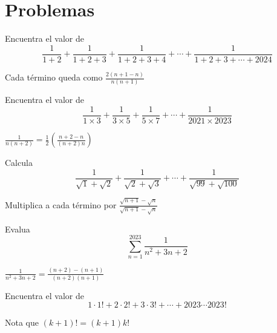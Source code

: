 \documentclass[11pt]{scrartcl}
\begin{document}
\bigskip
\section{Problemas}

\begin{problem}
    Encuentra el valor de 
    \[\frac{1}{1+2}+\frac{1}{1+2+3}+\frac{1}{1+2+3+4}+\cdots+\frac{1}{1+2+3+\cdots+2024}\]
    \begin{hint}
        Cada término queda como $\frac{2(n+1-n)}{n(n+1)}$
    \end{hint}
\end{problem} \hspace{0.2cm}
\begin{problem}
    Encuentra el valor de 
    \[\frac{1}{1\times 3}+\frac{1}{3\times 5}+\frac{1}{5\times 7}+\cdots+\frac{1}{2021\times 2023}\]
    \begin{hint}
        $\frac{1}{n(n+2)}=\frac{1}{2}\left(\frac{n+2-n}{(n+2)n}\right)$
    \end{hint}
\end{problem} \hspace{0.2cm}
\begin{problem}
    Calcula
    \[\frac{1}{\sqrt{1}+\sqrt{2}}+\frac{1}{\sqrt{2}+\sqrt{3}}+\cdots+\frac{1}{\sqrt{99}+\sqrt{100}}\]
    \begin{hint}
        Multiplica a cada término por $\frac{\sqrt{n+1}-\sqrt{n}}{\sqrt{n+1}-\sqrt{n}}$
        
    \end{hint}
    \end{problem} \hspace{0.2cm}
    \begin{problem}
        Evalua
        \[\sum_{n=1}^{2023} \frac{1}{n^2+3n+2}\]
        \begin{hint}
            $\frac{1}{n^2+3n+2}=\frac{(n+2)-(n+1)}{(n+2)(n+1)}$
        \end{hint}
    \end{problem} \hspace{0.2cm}
    \begin{problem}
        Encuentra el valor de 
        \[1\cdot 1!+2\cdot 2!+3\cdot 3!+\cdots + 2023\cdots 2023!\]
        \begin{hint}
            Nota que $(k+1)!=(k+1)k!$
        \end{hint}
    \end{problem} \hspace{0.2cm}
    
\end{document}
